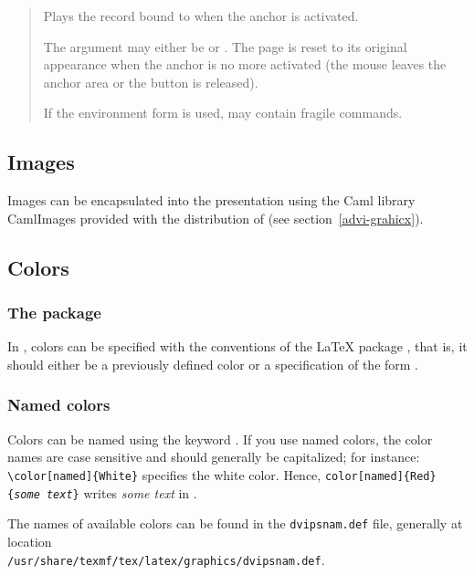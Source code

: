 \documentclass[12pt]{article}
\begin{document}
\begin{quote}
Plays the record bound to  when the anchor is activated.

The argument  may either be  or
. The page is reset to its original appearance when the
anchor is no more activated (the mouse leaves the anchor area or the
button is released).

If the environment form is used,  may contain fragile commands. 

\end{quote}


\subsection{Images}

Images can be encapsulated into the presentation using the Caml library
CamlImages provided with the distribution of {\ActiveDVI} (see
section~\ref {advi-grahicx}).

\subsection{Colors}

\subsubsection*{The  package}

In {\ActiveDVI}, colors can be specified with the conventions of the
{\LaTeX} package , that is, it should either be a
previously defined color or a specification of the form
 .

\subsubsection*{Named colors}

Colors can be named using the keyword .  If you use named
colors, the color names are case sensitive and should generally be
capitalized; for instance: \verb"\color[named]{White}" specifies the
white color. Hence, {\tt {}color[named]\{Red\}\{{\it some
text}\}} writes {\it some text} in {\color[named]{Red}{red}}.

The names of available colors can be found in the {\tt dvipsnam.def}
file, generally at location\\
{\tt /usr/share/texmf/tex/latex/graphics/dvipsnam.def}.
\end{document}
